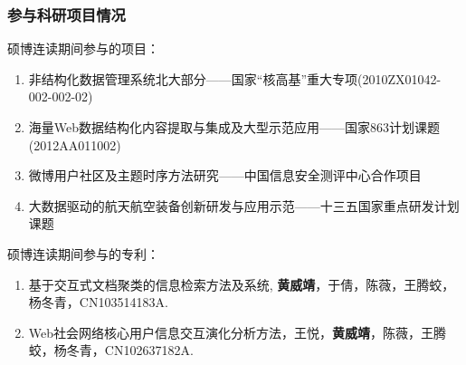 \begin{transparentFootline}
\begin{frame}
\frametitle{参与科研项目情况}

硕博连读期间参与的项目：
\footnotesize
\begin{enumerate}
\item 非结构化数据管理系统北大部分——国家“核高基”重大专项(2010ZX01042-002-002-02)
\item 海量Web数据结构化内容提取与集成及大型示范应用——国家863计划课题(2012AA011002)
\item 微博用户社区及主题时序方法研究——中国信息安全测评中心合作项目
\item 大数据驱动的航天航空装备创新研发与应用示范——十三五国家重点研发计划课题
\end{enumerate}

\vfill

\normalsize
硕博连读期间参与的专利：
\footnotesize
\begin{enumerate}
\item 基于交互式文档聚类的信息检索方法及系统, \textbf{黄威靖}，于倩，陈薇，王腾蛟，杨冬青，CN103514183A.
\item Web社会网络核心用户信息交互演化分析方法，王悦，\textbf{黄威靖}，陈薇，王腾蛟，杨冬青，CN102637182A.
\end{enumerate}

\end{frame}
\end{transparentFootline}


